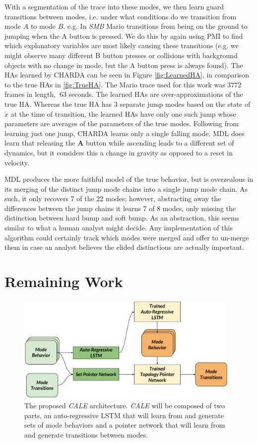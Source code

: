 \documentclass[12pt]{report}
\begin{document}
With a segmentation of the trace into these modes, we then learn guard transitions between modes, i.e. under what conditions do we transition from mode $A$ to mode $B$. e.g. In \textit{SMB} Mario transitions from being on the ground to jumping when the A button is pressed. We do this by again using PMI to find which explanatory variables are most likely causing these transitions (e.g. we might observe many different B button presses or collisions with background objects with no change in mode, but the A button press is always found). The HAs learned by CHARDA can be seen in Figure \ref{fig:LearnedHA}, in comparison to the true HAs in \ref{fig:TrueHA}.  The Mario trace used for this work was 3772 frames in length, $~63$ seconds.  The learned HAs are over-approximations of the true HA.  Whereas the true HA has 3 separate jump modes based on the state of $\dot{x}$ at the time of transition, the learned HAs have only one such jump whose parameters are averages of the parameters of the true modes.  Following from learning just one jump, CHARDA learns only a single falling mode.  MDL does learn that releasing the \textbf{A} button while ascending leads to a different set of dynamics, but it considers this a change in gravity as opposed to a reset in velocity.

MDL produces the more faithful model of the true behavior, but is overzealous in its merging of the distinct jump mode chains into a single jump mode chain. As such, it only recovers 7 of the 22 modes; however, abstracting away the differences between the jump chains it learns 7 of 8 modes, only missing the distinction between hard bump and soft bump. 
As an abstraction, this seems similar to what a human analyst might decide.
Any implementation of this algorithm could certainly track which modes were merged and offer to un-merge them in case an analyst believes the elided distinctions are actually important.
\section*{Remaining Work}

\begin{figure}[ht]
\centering
    \includegraphics[width=0.97\textwidth]{figures/CALE Architecture.pdf} 
   
    \caption{The proposed \textit{CALE} architecture.  \textit{CALE} will be composed of two parts, an auto-regressive LSTM that will learn from and generate sets of mode behaviors and a pointer network that will learn from and generate transitions between modes.}
  \label{fig:cale}
  \end{figure}
\end{document}
